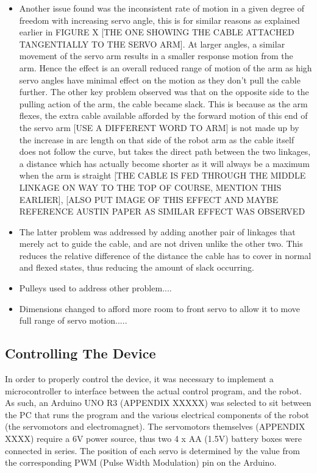 \documentclass[11pt]{article}
\begin{document}
\begin{itemize}
\item{Another issue found was the inconsistent rate of motion in a given degree of freedom with increasing servo angle, this is for similar reasons as explained earlier in FIGURE X [THE ONE SHOWING THE CABLE ATTACHED TANGENTIALLY TO THE SERVO ARM]. At larger angles, a similar movement of the servo arm results in a smaller response motion from the arm. Hence the effect is an overall reduced range of motion of the arm as high servo angles have minimal effect on the motion as they don't pull the cable further. The other key problem observed was that on the opposite side to the pulling action of the arm, the cable became slack. This is because as the arm flexes, the extra cable available afforded by the forward motion of this end of the servo arm [USE A DIFFERENT WORD TO ARM] is not made up by the increase in arc length on that side of the robot arm  as the cable itself does not follow the curve, but takes the  direct path between the two linkages, a distance which has actually become shorter as it will always be a maximum when the arm is straight [THE CABLE IS FED THROUGH THE MIDDLE LINKAGE ON WAY TO THE TOP OF COURSE, MENTION THIS EARLIER], [ALSO PUT IMAGE OF THIS EFFECT AND MAYBE REFERENCE AUSTIN PAPER AS SIMILAR EFFECT WAS OBSERVED}
\item{The latter problem was addressed by adding another pair of linkages that merely act to guide the cable, and are not driven unlike the other two. This reduces the relative difference of the distance the cable has to cover in normal and flexed states, thus reducing the amount of slack occurring.}
\item{Pulleys used to address other problem....}
\item{Dimensions changed to afford more room to front servo to allow it to move full range of servo motion.....} 
\end{itemize}


\pagebreak
\subsection{Controlling The Device}

In order to properly control the device, it was necessary to implement a microcontroller to interface between the actual control program, and the robot. As such, an Arduino UNO R3 (APPENDIX XXXXX) was selected to sit between the PC that runs the program and the various electrical components of the robot (the servomotors and electromagnet). The servomotors themselves (APPENDIX XXXX) require a 6V power source, thus two 4 x AA (1.5V) battery boxes were connected in series. The position of each servo is determined by the value from the corresponding PWM (Pulse Width Modulation) pin on the Arduino. 
\end{document}
